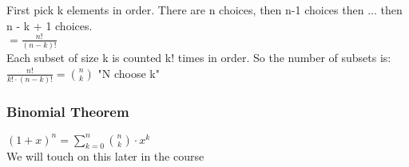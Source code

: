 \documentclass[12pt]{article}
\begin{document}
	First pick k elements in order. There are n choices, then n-1 choices then ... then n - k + 1 choices.\\
	
	$ = \frac{n!}{(n - k)!}$\\
	
	Each subset of size k is counted k! times in order. So the number of subsets is: \\
	
	$\frac{n!}{k! \cdot (n - k)!} = {n \choose k}$ "N choose k"\\
	
	\subsubsection*{Binomial Theorem}
	$(1 + x)^n = \sum_{k = 0}^{n} {n \choose k} \cdot x^k$\\
	
	We will touch on this later in the course
	
	
\end{document}
